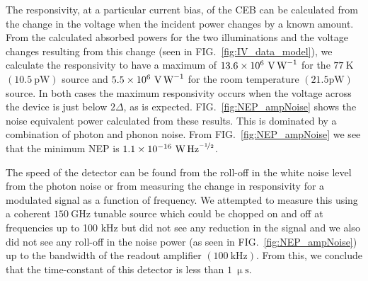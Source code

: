 \documentclass[aip, apl, a4paper, amsmath,amssymb, reprint]{revtex4-1}
\begin{document}
The responsivity, at a particular current bias, of the CEB can be calculated from the change in the voltage when the incident power changes by a known amount. From the calculated absorbed powers for the two illuminations and the voltage changes resulting from this change (seen in  FIG.~\ref{fig:IV_data_model}), we calculate the responsivity to have a maximum of $13.6 \times 10^{6}~\mathrm{\mbox{V\,W}^{-1}}$ for the $77~\mathrm{K}$ $(10.5~\mathrm{pW})$ source and $5.5 \times 10^{6}~\mathrm{\mbox{V\,W}^{-1}}$ for the room temperature $(21.5\mathrm{pW})$ source. In both cases the maximum responsivity occurs when the voltage across the device is just below $2\Delta$, as is expected. FIG.~\ref{fig:NEP_ampNoise} shows the noise equivalent power calculated from these results. This is dominated by a combination of photon and phonon noise. From FIG.~\ref{fig:NEP_ampNoise} we see that the minimum NEP is $1.1 \times 10^{-16}~\mathrm{\mbox{W\,Hz}^{\nicefrac{-1}{2}}}$.

The speed of the detector can be found from the roll-off in the white noise level from the photon noise or from measuring the change in responsivity for a modulated signal as a function of frequency. We attempted to measure this using a coherent $150~\mathrm{GHz}$ tunable source which could be chopped on and off at frequencies up to 100 kHz but did not see any reduction in the signal and we also did not see any roll-off in the noise power (as seen in FIG.~\ref{fig:NEP_ampNoise}) up to the bandwidth of the readout amplifier $\left(100~\mathrm{kHz}\right)$. From this, we conclude that the time-constant of this detector is less than $1~\mathrm{\upmu s}$.
\end{document}
